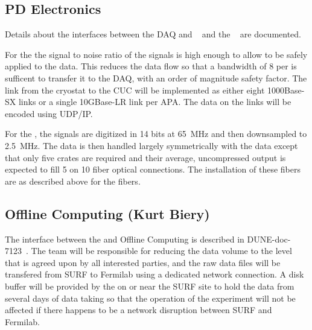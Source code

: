 
\subsection{PD Electronics}
\label{sec:fd-daq-intfc-photon}

Details about the interfaces between the DAQ and 
~\cite{docdb6727} and the 
~\cite{docdb6802} are documented. 


For the   the signal to noise ratio of the
 signals is high enough to allow  to be safely
applied to the data. This reduces the data flow so that a bandwidth of
\SI{8}{\Gbps} per  is sufficent to transfer it to the DAQ,
with an order of magnitude safety factor. The link from the 
cryostat to the CUC will be implemented as either eight 1000Base-SX
links or a single 10GBase-LR link per APA.
The data on the links will be encoded using UDP/IP.

For the  , the signals are digitized in 14 bits
at \SI{65}{\MHz} and then downsampled to \SI{2.5}{\MHz}. 
The data is then handled largely symmetrically with the 
data except that only five  crates are required and their
average, uncompressed output is expected to fill \SI{5}{\Gbps} on
\SI{10}{\Gbps} fiber optical connections. 
The installation of these fibers are as described above for the
 fibers.

\subsection{Offline Computing (Kurt Biery)}
\label{sec:fd-daq-intfc-fnal-cmptg}

The interface between the  and Offline Computing is
described in DUNE-doc-7123~\cite{docdb7123}.
The  team will be responsible for reducing the data volume
to the level that is agreed upon by all interested parties, and the
raw data files will be transfered from SURF to Fermilab using a
dedicated network connection.
A disk buffer will be provided by the  on or near the SURF
site to hold the data from several days of data taking so that the
operation of the experiment will not be affected if there happens to
be a network disruption between SURF and Fermilab.

